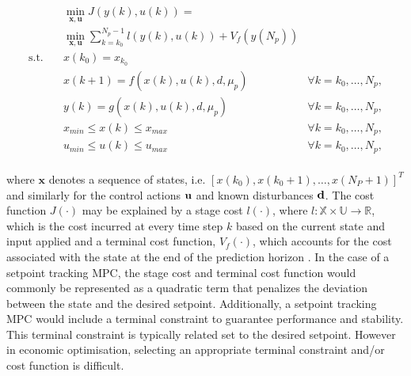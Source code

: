 \begin{equation}
	\begin{aligned}
		& \min_{\mathbf{x},\mathbf{u}} J(y(k),u(k)) = \\ 
		& \min_{\mathbf{x},\mathbf{u}} \sum_{k=k_0}^{N_p-1} l(y(k),u(k)) + V_f(y(N_p))  \\
		\text{s.t.} \quad  & x(k_0) = x_{k_0}                             &\\
		& x(k+1) = f(x(k),u(k),d, \mu_p)       & \forall k = k_0,\hdots, N_p,\\
		& y(k) = g(x(k),u(k),d,\mu_p)                 & \forall k = k_0,\hdots, N_p,\\
		& x_{min} \leq x(k) \leq x_{max}                  & \forall k = k_0,\hdots, N_p,\\
		& u_{min} \leq u(k) \leq u_{max}                  & \forall k = k_0,\hdots, N_p,\\
	\end{aligned}
	\label{eq:mcp ocp}
\end{equation}

where $\mathbf{x}$ denotes a sequence of states, i.e. $[x(k_0), x(k_0+1), \hdots, x(N_P+1)]^T$  and similarly for the control actions $\bold{u}$ and known disturbances $\bold{d}$. The cost function $J(\cdot)$ may be explained by a stage cost $l(\cdot)$, where $l: \mathbb X \times \mathbb U \rightarrow \mathbb R$, which is the cost incurred at every time step $k$ based on the current state and input applied and a terminal cost function, $V_f(\cdot)$, which accounts for the cost associated with the state at the end of the prediction horizon \cite{daiDiscreteTimeModelPredictive2012,boersmaRobustSamplebasedModel2022}. In the case of a setpoint tracking MPC, the stage cost and terminal cost function would commonly be represented as a quadratic term that penalizes the deviation between the state and the desired setpoint. Additionally, a setpoint tracking MPC would include a terminal constraint to guarantee performance and stability. This terminal constraint is typically related set to the desired setpoint. However in economic optimisation, selecting an appropriate terminal constraint and/or cost function is difficult.

